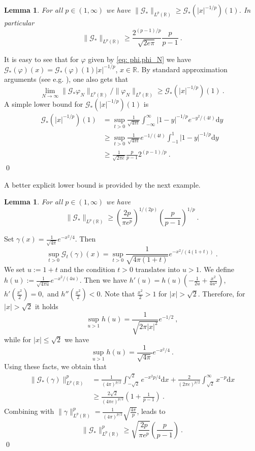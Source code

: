 \documentclass[a4paper, reqno]{amsart}
\newtheorem{lemma}[thm]{Lemma}
\theoremstyle{definition}
\newcommand{\R}{{\mathbb R}}
\newcommand{\dd}{{\mathrm d}}
\newcommand{\mG}{\mathcal{G}}
\begin{document}
\begin{lemma}
 For all $p\in (1,\infty)$ we have $\| \mathcal{G}_\ast \|_{L^p(\mathbb{R})} \geq \mG_\ast(|x|^{-1/p})(1) $. In particular
    $$\| \mathcal{G}_\ast \|_{L^p(\mathbb{R})} \geq \frac{2^{(p-1)/p}}{\sqrt{2e\pi}} \frac{p}{p-1}~.$$   
\end{lemma}
\proof It is easy to see that for $\varphi$ given by \eqref{eq: phi,phi_N} we have
$\mG_\ast(\varphi)(x)=\mG_\ast(\varphi)(1)|x|^{-1/p}$, $x\in \R.$ By standard approximation arguments (see e.g. \cite[Proof~of~Thm.~3.2]{DSS}), one also gets that $$\lim_{N\rightarrow\infty}\|\mG_\ast \varphi_N\|_{L^p(\mathbb{R})}/\|\varphi_N\|_{L^p(\mathbb{R})}\geq  \mG_\ast(|x|^{-1/p})(1)~.$$ 
A simple lower bound for $ \mG_\ast(|x|^{-1/p})(1)$ is 
\begin{align*}
 \mG_\ast(|x|^{-1/p})(1)&= \sup_{t>0}\frac{1}{\sqrt{4\pi t}}\int_{-\infty}^\infty |1-y|^{-1/p}e^{-y^2/(4t)}\dd y \\
    &\geq \sup_{t>0}\frac{1}{\sqrt{4\pi t}} e^{-1/(4t)}\int_{-1}^1 |1-y|^{-1/p} \dd y\\
    & \geq \frac{1}{\sqrt{2\pi e}} \frac{p}{p-1} 2^{(p-1)/p}~.
\end{align*}
\qed 

A better explicit lower bound is provided by the next example.

\begin{lemma}
     For all $p\in (1,\infty)$ we have
    $$\| \mathcal{G}_\ast \|_{L^p(\mathbb{R})} \geq  \left(\frac{2p}{\pi e^p}\right)^{1/(2p)} \left(\frac{p}{p-1}\right)^{1/p}~.$$   
\end{lemma}
\proof 
Set $\gamma(x)=\frac{1}{\sqrt{4\pi }}e^{-x^2/4}.$ Then
$$\sup_{t>0}\mG_t(\gamma)(x)=\sup_{t>0} \frac{1}{\sqrt{4\pi(1+t)}}e^{-x^2/(4(1+t))}~.$$
We set $u:=1+t$ and the condition $t>0$ translates into $u>1$. We define $h(u):=\frac{1}{\sqrt{4\pi u}}e^{-x^2/(4u)}$. Then we have $h'(u)=h(u)(-\frac{1}{2u}+\frac{x^2}{4u^2})$, $h'(\frac{x^2}{2})=0,$ and $h''(\frac{x^2}{2})<0$. Note that $\frac{x^2}{2}>1$ for $|x|>\sqrt{2}$. Therefore, for $|x|>\sqrt{2}$ it holds
$$\sup_{u>1} h(u)= \frac{1}{\sqrt{2\pi |x|^2}}e^{-1/2}~,$$
while for $|x|\leq \sqrt{2}$ we have
$$\sup_{u>1} h(u)= \frac{1}{\sqrt{4\pi }}e^{-x^2/4}~.$$
Using these facts, we obtain that
\begin{align*}
\|\mG_*(\gamma)\|_{L^p(\mathbb{R})}^p &= \frac{1}{(4\pi )^{p/2}}\int_{-\sqrt{2}}^{\sqrt{2}} e^{-x^2p/4}\dd x + \frac{2}{(2\pi e)^{p/2}}\int_{\sqrt{2}}^\infty x^{-p}\dd x\\
& \geq \frac{2\sqrt{2}}{(4\pi  e)^{p/2}} \left( 1 + \frac{1}{p-1}\right)~.
\end{align*}
Combining with $\|\gamma\|_{L^p(\mathbb{R})}^p = \frac{1}{(4\pi )^{p/2}}\sqrt{\frac{4\pi }{p}}$, leads to
$$\|\mG_\ast\|_{L^p(\mathbb{R})}^p \geq \sqrt{\frac{2p}{\pi e^p}}\left( \frac{p}{p-1} \right)~.$$
\qed
\end{document}
